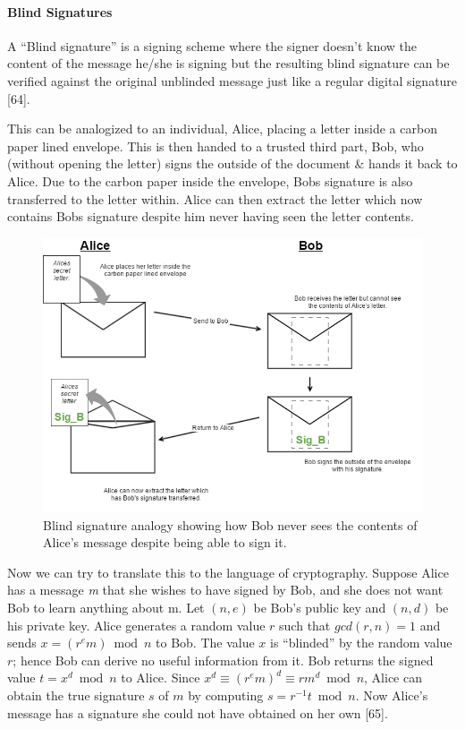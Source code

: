 \documentclass{article}
\begin{document}
\begin{adjustwidth}{0.5cm}{}
	\paragraph{Blind Signatures}
	\hfill \break \break

	A ``Blind signature'' is a signing scheme where the signer doesn't know the content of the message he/she is signing but the resulting blind signature can be verified against the original unblinded message just like a regular digital signature {\Large [64]}.

	This can be analogized to an individual, Alice, placing a letter inside a carbon paper lined envelope. This is then handed to a trusted third part, Bob, who (without opening the letter) signs the outside of the document \& hands it back to Alice. Due to the carbon paper inside the envelope, Bobs signature is also transferred to the letter within. Alice can then extract the letter which now contains Bobs signature despite him never having seen the letter contents.

	\begin{figure}[h]
	\begin{adjustwidth}{0.5cm}{}
	  	\includegraphics[width=\textwidth]{Blind_Signatures}
		\caption{Blind signature analogy showing how Bob never sees the contents of Alice's message despite being able to sign it.}
	\end{adjustwidth}
	\end{figure}

	Now we can try to translate this to the language of cryptography. Suppose Alice has a message \textit{m} that she wishes to have signed by Bob, and she does not want Bob to learn anything about m. Let \((n,e)\) be Bob's public key and \((n,d)\) be his private key. Alice generates a random value \(r\) such that \(gcd(r, n) = 1\) and sends \(x = (r^e m) \bmod n\) to Bob. The value \(x\) is ``blinded'' by the random value \(r\); hence Bob can derive no useful information from it. Bob returns the signed value \(t = x^d \bmod n\) to Alice. Since \(x^d \equiv (r^e m)^d \equiv rm^d \bmod n\), Alice can obtain the true signature \(s\) of \(m\) by computing \(s = r^{-1} t \bmod n\). Now Alice's message has a signature she could not have obtained on her own {\Large [65]}.
\end{adjustwidth}
\end{document}
